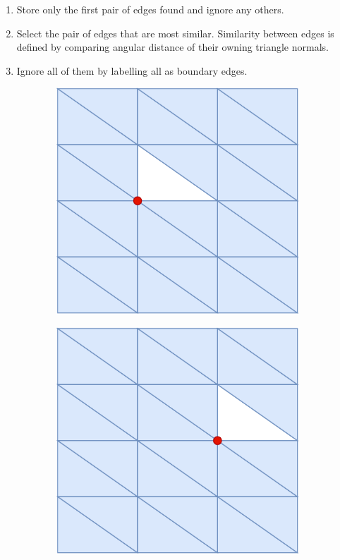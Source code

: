 \begin{enumerate}
    \item Store only the first pair of edges found and ignore any others.
    \item Select the pair of edges that are most similar. Similarity between edges is defined by comparing angular distance of their owning triangle normals. 
    \item Ignore all of them by labelling all as boundary edges.
\end{enumerate}


\begin{figure}[ht]
\centering
  \begin{subfigure}{.24\linewidth}
    \centering\includegraphics[width=.9\linewidth]{chapter_3_polylidar3d/imgs/OPCHalfEdge-ManifoldMeshA.pdf}
    \caption{\label{fig:ch3_NonMainifoldCond1A}}\vspace{6pt}
  \end{subfigure}
  \begin{subfigure}{.24\linewidth}
    \centering\includegraphics[width=.9\linewidth]{chapter_3_polylidar3d/imgs/OPCHalfEdge-ManifoldMeshB.pdf}

\end{subfigure}
\end{figure}
